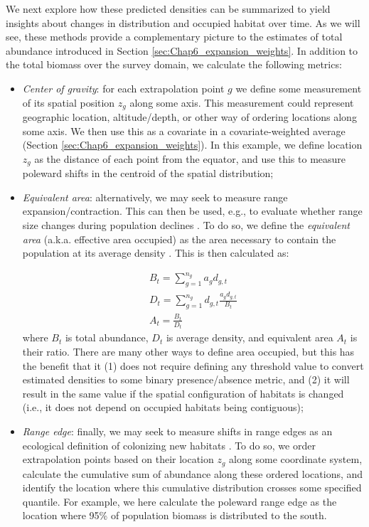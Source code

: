 We next explore how these predicted densities can be summarized to yield insights about changes in distribution and occupied habitat over time.  As we will see, these methods provide a complementary picture to the estimates of total abundance introduced in Section \ref{sec:Chap6_expansion_weights}.  In addition to the total biomass over the survey domain, we calculate the following metrics:
\begin{itemize}
    \item \textit{Center of gravity}:  for each extrapolation point \(g\) we define some measurement of its spatial position \(z_g\) along some axis.  This measurement could represent geographic location, altitude/depth, or other way of ordering locations along some axis.  We then use this as a covariate in a covariate-weighted average (Section \ref{sec:Chap6_expansion_weights}).  In this example, we define location \(z_g\) as the distance of each point from the equator, and use this to measure poleward shifts in the centroid of the spatial distribution;
    
    \item \textit{{Equivalent area}}:  alternatively, we may seek to measure range expansion/contraction.  This can then be used, e.g., to evaluate whether range size changes during population declines \cite{thorson_density-dependent_2016}.  To do so, we define the \textit{equivalent area} (a.k.a. effective area occupied) as the area necessary to contain the population at its average density \cite{woillez_notes_2009}.  This is then calculated as:
    
\begin{equation}
\begin{gathered}
    B_t = \sum_{g=1}^{n_g} a_g d_{g,t} \\
    D_t = \sum_{g=1}^{n_g} d_{g,t} \frac{a_g d_{g,t}}{B_t}  \\
    A_t = \frac{B_t}{D_t}
\end{gathered}
\end{equation}
    where \( B_t \) is total abundance, \( D_t \) is average density, and equivalent area \(A_t\) is their ratio.  There are many other ways to define area occupied, but this has the benefit that it (1) does not require defining any threshold value to convert estimated densities to some binary presence/absence metric, and (2) it will result in the same value if the spatial configuration of habitats is changed (i.e., it does not depend on occupied habitats being contiguous);
    
    \item \textit{Range edge}:  finally, we may seek to measure shifts in range edges as an ecological definition of colonizing new habitats \cite{fredston_range_2021}.  To do so, we order extrapolation points based on their location \(z_g\) along some coordinate system, calculate the cumulative sum of abundance along these ordered locations, and identify the location where this cumulative distribution crosses some specified quantile.  For example, we here calculate the poleward range edge as the location where 95\% of population biomass is distributed to the south.  
\end{itemize}
